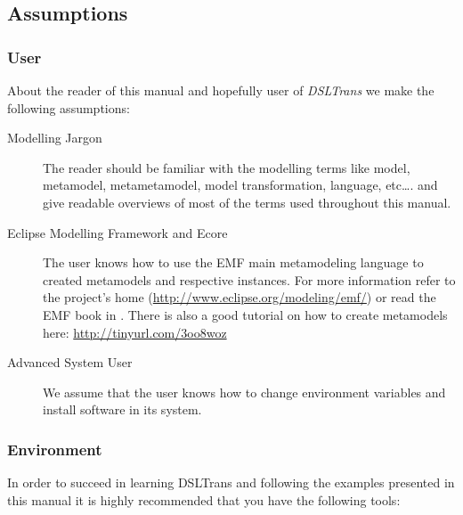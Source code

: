 

\clearpage

\subsection{Assumptions}

\subsubsection{User}

About the reader of this manual and hopefully user of \emph{DSLTrans} we make
the following assumptions:

\begin{description}
  \item[Modelling Jargon] The reader should be familiar with the modelling terms
  like model, metamodel, metametamodel, model transformation, language,
  etc\ldots. \cite{unification_models} and \cite{model_transformations} give
  readable overviews of most of the terms used throughout this manual.
  \item[Eclipse Modelling Framework and Ecore] The user knows how to use the EMF
  main metamodeling language to created metamodels and respective instances. For
  more information refer to the project's home
  (\url{http://www.eclipse.org/modeling/emf/}) or read the EMF book in
  \cite{emf_book}. There is also a good tutorial on how to create
  metamodels here:
  \url{http://tinyurl.com/3oo8woz} 
  \item[Advanced System User] We assume that the user knows how to change
  environment variables and install software in its system.
\end{description}


\subsubsection{Environment}

In order to succeed in learning DSLTrans and following the examples presented in
this manual it is highly recommended that you have the following tools:


